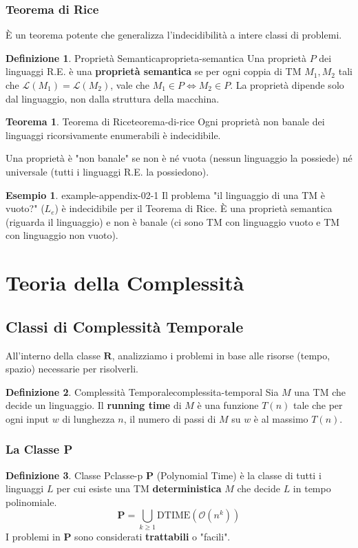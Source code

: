 \documentclass[a4paper]{article}
\theoremstyle{definition} %
\newtheorem{theorem}{Teorema}
\newtheorem{definition}{Definizione}
\newtheorem{example}{Esempio}
\newcommand{\lang}[1]{\mathcal{L}(#1)}
\newcommand{\bigO}[1]{\mathcal{O}(#1)}
\begin{document}
\subsubsection{Teorema di Rice}
È un teorema potente che generalizza l'indecidibilità a intere classi di problemi.
\begin{definition}{Proprietà Semantica}{proprieta-semantica}
Una proprietà $P$ dei linguaggi R.E. è una \textbf{proprietà semantica} se per ogni coppia di TM $M_1, M_2$ tali che $\lang{M_1} = \lang{M_2}$, vale che $M_1 \in P \iff M_2 \in P$. La proprietà dipende solo dal linguaggio, non dalla struttura della macchina.
\end{definition}
\begin{theorem}{Teorema di Rice}{teorema-di-rice}
Ogni proprietà non banale dei linguaggi ricorsivamente enumerabili è indecidibile.
\end{theorem}
Una proprietà è "non banale" se non è né vuota (nessun linguaggio la possiede) né universale (tutti i linguaggi R.E. la possiedono).
\begin{example}{}{{ example-appendix-02-1 }}
Il problema "il linguaggio di una TM è vuoto?" ($L_e$) è indecidibile per il Teorema di Rice. È una proprietà semantica (riguarda il linguaggio) e non è banale (ci sono TM con linguaggio vuoto e TM con linguaggio non vuoto).
\end{example}

\section{Teoria della Complessità}

\subsection{Classi di Complessità Temporale}
All'interno della classe $\mathbf{R}$, analizziamo i problemi in base alle risorse (tempo, spazio) necessarie per risolverli.
\begin{definition}{Complessità Temporale}{complessita-temporal}
Sia $M$ una TM che decide un linguaggio. Il \textbf{running time} di $M$ è una funzione $T(n)$ tale che per ogni input $w$ di lunghezza $n$, il numero di passi di $M$ su $w$ è al massimo $T(n)$.
\end{definition}

\subsubsection{La Classe P}
\begin{definition}{Classe P}{classe-p}
$\mathbf{P}$ (Polynomial Time) è la classe di tutti i linguaggi $L$ per cui esiste una TM \textbf{deterministica} $M$ che decide $L$ in tempo polinomiale.
$$ \mathbf{P} = \bigcup_{k \ge 1} \text{DTIME}(\bigO{n^k}) $$
I problemi in $\mathbf{P}$ sono considerati \textbf{trattabili} o "facili".
\end{definition}
\end{document}
